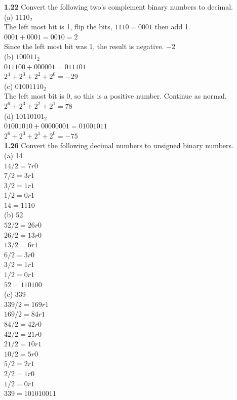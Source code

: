 \documentclass[12pt,a4paper]{report}
\begin{document}
\begin{normalsize}
\textbf{1.22} Convert the following two's complement binary numbers to decimal. \\
(a) $ 1110_{2} $ \\ 
The left most bit is 1, flip the bits, $ 1110 = 0001 $ then add 1. $ 0001 + 0001 = 0010 = 2 $ \\
Since the left most bit was 1, the result is negative. $ -2 $ \\
(b) $ 100011_{2} $ \\ 
$ 011100 + 000001 = 011101 $ \\
$ 2^{4} + 2^{3} + 2^{2} + 2^{0} = -29 $ \\
(c) $ 01001110_{2} $ \\ 
The left most bit is 0, so this is a positive number. Continue as normal. \\
$ 2^{6} + 2^{3} + 2^{2} + 2^{1} = 78 $ \\
(d) $ 10110101_{2} $ \\ 
$ 01001010 + 00000001 = 01001011 $ \\
$  2^{6} + 2^{3} + 2^{1} + 2^{0} = -75 $ \\

\textbf{1.26} Convert the following decimal numbers to unsigned binary numbers. \\
(a) 14 \\
$ 14/2 = 7 r 0 $ \\
$ 7/2 = 3 r 1 $ \\
$ 3/2 = 1 r 1 $ \\
$ 1/2 = 0 r 1 $ \\
$ 14 = 1110 $ \\

(b) 52 \\
$ 52/2 = 26 r 0 $ \\
$ 26/2 = 13 r 0 $ \\
$ 13/2 = 6 r 1 $ \\
$ 6/2 = 3 r 0 $ \\
$ 3/2 = 1 r 1 $ \\
$ 1/2 = 0 r 1 $ \\
$ 52 = 110100 $ \\

(c) 339 \\
$ 339/2 = 169 r 1 $ \\
$ 169/2 = 84 r 1 $\\
$ 84/2 = 42 r 0 $\\
$ 42/2 = 21 r 0 $\\
$ 21/2 = 10 r 1 $\\
$ 10/2 = 5 r 0 $\\
$ 5/2 = 2 r 1 $\\
$ 2/2 = 1 r 0 $\\
$ 1/2 = 0 r 1 $\\
$ 339 = 101010011 $\\


\end{normalsize}
\end{document}
